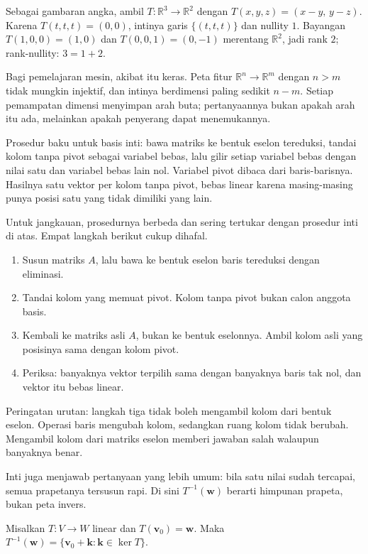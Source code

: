 Sebagai gambaran angka, ambil $T\colon\mathbb{R}^{3}\to\mathbb{R}^{2}$ dengan
$T(x,y,z)=(x-y,\,y-z)$. Karena $T(t,t,t)=(0,0)$, intinya garis $\{(t,t,t)\}$ dan nullity
$1$.
Bayangan $T(1,0,0)=(1,0)$ dan $T(0,0,1)=(0,-1)$ merentang $\mathbb{R}^{2}$, jadi rank $2$;
rank-nullity: $3=1+2$.

Bagi pemelajaran mesin, akibat itu keras. Peta fitur $\mathbb{R}^{n}\to\mathbb{R}^{m}$
dengan $n>m$ tidak mungkin injektif, dan intinya berdimensi paling sedikit $n-m$. Setiap
pemampatan dimensi menyimpan arah buta; pertanyaannya bukan apakah arah itu ada, melainkan
apakah penyerang dapat menemukannya.

Prosedur baku untuk basis inti: bawa matriks ke bentuk eselon tereduksi, tandai kolom
tanpa pivot sebagai variabel bebas, lalu gilir setiap variabel bebas dengan nilai satu dan
variabel bebas lain nol. Variabel pivot dibaca dari baris-barisnya. Hasilnya satu vektor per
kolom tanpa pivot, bebas linear karena masing-masing punya posisi satu yang tidak dimiliki
yang
lain.

Untuk jangkauan, prosedurnya berbeda dan sering tertukar dengan prosedur inti di atas. Empat
langkah berikut cukup dihafal.

\begin{resep}
\begin{enumerate}
  \item Susun matriks $A$, lalu bawa ke bentuk eselon baris tereduksi dengan eliminasi.
  \item Tandai kolom yang memuat pivot. Kolom tanpa pivot bukan calon anggota basis.
  \item Kembali ke matriks asli $A$, bukan ke bentuk eselonnya. Ambil kolom asli yang posisinya
        sama dengan kolom pivot.
  \item Periksa: banyaknya vektor terpilih sama dengan banyaknya baris tak nol, dan vektor itu
        bebas linear.
\end{enumerate}
Peringatan urutan: langkah tiga tidak boleh mengambil kolom dari bentuk eselon. Operasi
baris
mengubah kolom, sedangkan ruang kolom tidak berubah. Mengambil kolom dari matriks eselon
memberi jawaban salah walaupun banyaknya benar.
\end{resep}

Inti juga menjawab pertanyaan yang lebih umum: bila satu nilai sudah tercapai, semua
prapetanya tersusun rapi. Di sini $T^{-1}(\mathbf{w})$ berarti himpunan prapeta, bukan peta
invers.

\begin{proposisi}
Misalkan $T\colon V\to W$ linear dan $T(\mathbf{v}_{0})=\mathbf{w}$. Maka
$T^{-1}(\mathbf{w})=\{\mathbf{v}_{0}+\mathbf{k}:\mathbf{k}\in\ker T\}$.
\end{proposisi}

